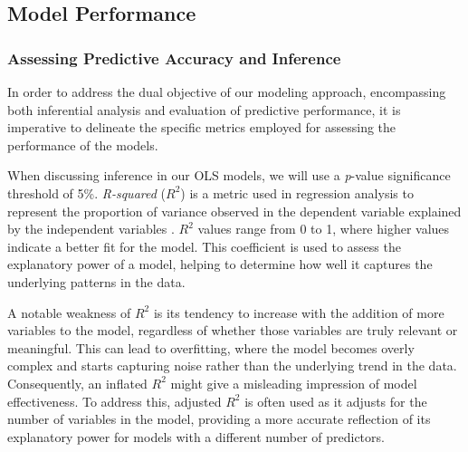 
\subsection{Model Performance}

\subsubsection{Assessing Predictive Accuracy and Inference}
\label{sec:modelperformance}


In order to address the dual objective of our modeling approach, encompassing both inferential analysis and evaluation of predictive performance, it is imperative to delineate the specific metrics employed for assessing the performance of the models. %

When discussing inference in our OLS models, we will use a \textit{p}-value significance threshold of 5\%. \textit{R-squared} (\(R^2\)) is a metric used in regression analysis to represent the proportion of variance observed in the dependent variable explained by the independent variables \parencite{casella2002}. \(R^2\) values range from 0 to 1, where higher values indicate a better fit for the model. This coefficient is used to assess the explanatory power of a model, helping to determine how well it captures the underlying patterns in the data.

A notable weakness of \(R^2\) is its tendency to increase with the addition of more variables to the model, regardless of whether those variables are truly relevant or meaningful. This can lead to overfitting, where the model becomes overly complex and starts capturing noise rather than the underlying trend in the data. Consequently, an inflated \(R^2\) might give a misleading impression of model effectiveness. To address this, adjusted \(R^2\) is often used as it adjusts for the number of variables in the model, providing a more accurate reflection of its explanatory power for models with a different number of predictors.

